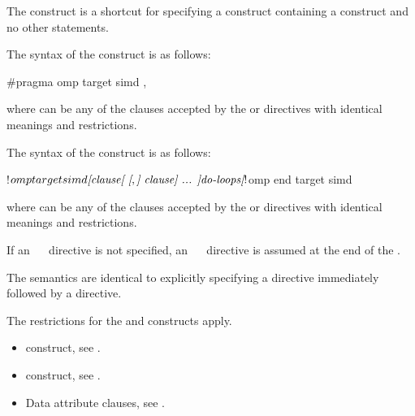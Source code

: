 \summary
The   construct is a shortcut for specifying a 
construct containing a  construct and no other statements.


\syntax
\begin{ccppspecific}
The syntax of the   construct is as follows:

\begin{ompcPragma}
#pragma omp target simd \plc{[clause[ [},\plc{] clause] ... ] new-line}
\end{ompcPragma}

where  can be any of the clauses accepted by the  or
 directives with identical meanings and restrictions.

\end{ccppspecific}

\begin{fortranspecific}
The syntax of the   construct is as follows:

\begin{ompfPragma}
!$omp target simd \plc{[clause[ [},\plc{] clause] ... ]}
    \plc{do-loops}
\plc{[}!$omp end target simd\plc{]}
\end{ompfPragma}

where  can be any of the clauses accepted by the  or
 directives with identical meanings and restrictions.

If an ~~ directive is not specified, an
~~ directive is assumed at the end of
the .
\end{fortranspecific}

\descr
The semantics are identical to explicitly specifying a  directive
immediately followed by a  directive.

\restrictions

The restrictions for the  and  constructs apply.

\crossreferences
\begin{itemize}
\item {} construct, see
.

\item {} construct, see
.

\item Data attribute clauses, see
.
\end{itemize}









